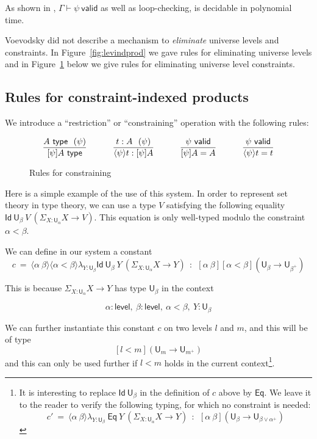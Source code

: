 \documentclass[11pt,a4paper]{article}
\theoremstyle{definition}
\newcommand{\Id}{\mathsf{Id}}
\newcommand{\Eq}{\mathsf{Eq}}
\newcommand{\UU}{\mathsf{U}}
\newcommand{\Level}{\mathsf{level}}
\newcommand{\valid}{\mathsf{valid}}
\newcommand{\type}{\mathsf{type}}
\newcommand{\lam}[1]{{\langle}#1{\rangle}}
\begin{document}
As shown in \cite{bezem-coquand:lattices}, $\Gamma\vdash\psi~\valid$
as well as loop-checking, is decidable in polynomial time.


Voevodsky \cite {VV} did not describe a mechanism to {\em eliminate}
universe levels and constraints. In Figure~\ref{fig:levindprod} we
gave rules for eliminating universe levels
and in Figure~\ref{fig:restriction} below we give rules
for eliminating universe level constraints.

\subsection*{Rules for constraint-indexed products}%
We introduce a ``restriction'' or ``constraining'' operation with
the following rules:
\begin{figure}[H]
  \caption{Rules for constraining}%
  \label{fig:restriction}
$$
\frac{A~\type~~(\psi)}{[\psi]A~\type}~~~~~~~~~
\frac{{t}:A~~(\psi)}{\lam{\psi}{t}:[\psi]A}~~~~~~~~~
\frac{\psi~\valid}{[\psi]A = A}~~~~~~~~~
\frac{\psi~\valid}{\lam{\psi}{t} = t}
\belowdisplayshortskip 1pt
$$
\end{figure}


Here is a simple example of the use of this system.
In order to represent set theory in type
theory, we can use a type $V$ satisfying the following equality $\Id~{\UU_{\beta}}~V~(\Sigma_{X:\UU_{\alpha}}X\rightarrow V)$.
This equation is only well-typed modulo the constraint $\alpha<\beta$.

We can define in our system a constant
$$
c~=~\lam{\alpha~\beta}\lam{\alpha<\beta}\lambda_{Y:\UU_{\beta}}\Id~{\UU_{\beta}}~Y~ (\Sigma_{X:\UU_{\alpha}}X\rightarrow Y)~~:~~
   [\alpha~\beta][\alpha<\beta](\UU_{\beta} \rightarrow \UU_{\beta^+})
$$

   This is because $\Sigma_{X:\UU_{\alpha}}X\rightarrow Y$ has type $\UU_{\beta}$ in the context

   $$\alpha:\Level,~\beta:\Level,~\alpha<\beta,~Y:\UU_{\beta}$$

   We can further instantiate this constant $c$ on two levels $l$ and $m$, and this will be of type
   $$[l<m](\UU_{m} \rightarrow \UU_{m^+})$$
   and this can only be used further if $l<m$ holds in the current
   context\footnote{It is interesting to replace $\Id~\UU_\beta$ in the
   definition of
$c$ above by $\Eq$. We leave it to the reader to verify the
following typing, for which no constraint is needed:
$$
c'~=~\lam{\alpha~\beta}\lambda_{Y:\UU_{\beta}}~\Eq~Y~ (\Sigma_{X:\UU_{\alpha}}X\rightarrow Y)~~:~~
   [\alpha~\beta](\UU_{\beta} \rightarrow \UU_{\beta\vee\alpha^+})
$$}.
\end{document}
